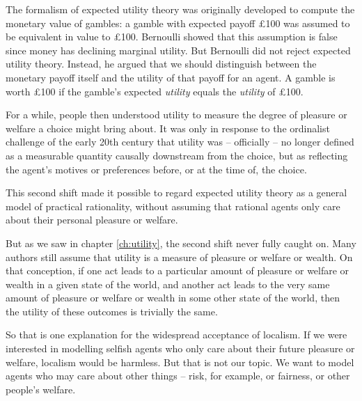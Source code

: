 The formalism of expected utility theory was originally developed to
compute the monetary value of gambles: a gamble with expected payoff
£100 was assumed to be equivalent in value to £100. Bernoulli showed
that this assumption is false since money has declining marginal
utility. But Bernoulli did not reject expected utility
theory. Instead, he argued that we should distinguish between the
monetary payoff itself and the utility of that payoff for an agent. A
gamble is worth £100 if the gamble's expected \emph{utility} equals
the \emph{utility} of £100.

For a while, people then understood utility to measure the degree of
pleasure or welfare a choice might bring about. It was only in
response to the ordinalist challenge of the early 20th century that
utility was -- officially -- no longer defined as a measurable
quantity causally downstream from the choice, but as reflecting the
agent's motives or preferences before, or at the time of, the choice.

This second shift made it possible to regard expected utility theory
as a general model of practical rationality, without assuming that
rational agents only care about their personal pleasure or welfare.

But as we saw in chapter \ref{ch:utility}, the second shift never
fully caught on. Many authors still assume that utility is a measure
of pleasure or welfare or wealth. On that conception, if one act leads
to a particular amount of pleasure or welfare or wealth in a given
state of the world, and another act leads to the very same amount of
pleasure or welfare or wealth in some other state of the world, then
the utility of these outcomes is trivially the same. 

So that is one explanation for the widespread acceptance of
localism. If we were interested in modelling selfish agents who only
care about their future pleasure or welfare, localism would be
harmless. But that is not our topic. We want to model agents who may
care about other things -- risk, for example, or fairness, or other
people's welfare.

